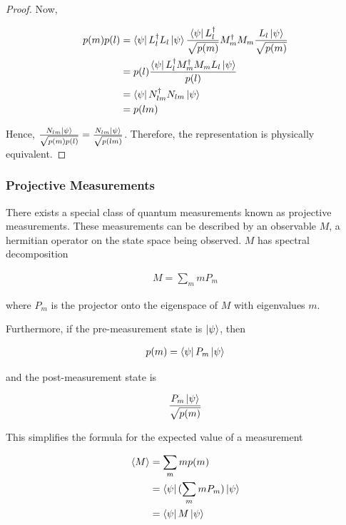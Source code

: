 \documentclass[main.tex]{subfiles}
\begin{document}
\begin{subappendices}
\begin{exercise}
\begin{proof}
Now, 

\begin{align*}
p(m)p(l) &= \bra{\psi} L_l^\dagger L_l \ket{\psi}\frac{\bra{\psi} L_l^\dagger}{\sqrt{p(m)}}M_m^\dag M_m \frac{L_l \ket{\psi}}{\sqrt{p(m)}} \\
&= p(l) \frac{\bra{\psi} L_l^\dagger M_m^\dag M_m L_l \ket{\psi}}{p(l)}\\
&= \bra{\psi} N_{lm}^\dagger N_{lm} \ket{\psi}\\
&= p(lm)
\end{align*}

Hence, $\frac{N_{lm} \ket{\psi}}{\sqrt{p(m)p(l)}}=\frac{N_{lm} \ket{\psi}}{\sqrt{p(lm)}}$. Therefore, the representation is physically equivalent.
\end{proof}

\end{exercise}

\subsubsection{Projective Measurements}

There exists a special class of quantum measurements known as projective measurements. These measurements can be described by an observable $M$, a hermitian operator on the state space being observed. $M$ has spectral decomposition

\begin{align*}
M = \sum_m m P_m	
\end{align*}

where $P_m$ is the projector onto the eigenspace of $M$ with eigenvalues $m$. 

Furthermore, if the pre-measurement state is $\ket{\psi}$, then 

\begin{align*}
p(m) = 	\bra{\psi} P_m \ket{\psi}
\end{align*}

and the post-measurement state is 

\begin{align*}
	\frac{P_m \ket{\psi}}{\sqrt{p(m)}}
\end{align*}

This simplifies the formula for the expected value of a measurement

\begin{align*}
\langle M \rangle &= \sum_m m p(m) \\
&= \bra{\psi} (\sum_m m P_m)  \ket{\psi} \\
&= 	\bra{\psi} M \ket{\psi}
\end{align*}


\end{subappendices}
\end{document}
